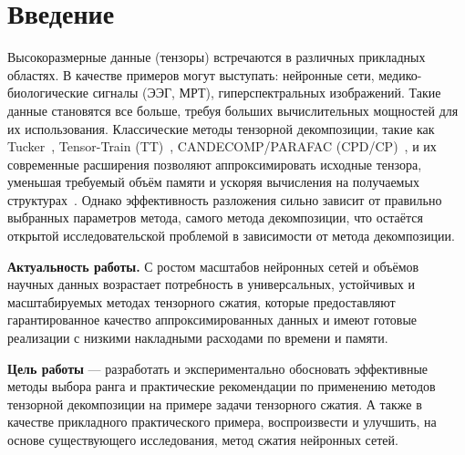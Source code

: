 \chapter{Введение}
\label{chap:intro}


Высокоразмерные данные (тензоры) встречаются в различных прикладных областях. В качестве примеров могут выступать: нейронные сети, медико-биологические сигналы (ЭЭГ, МРТ), гиперспектральных изображений. Такие данные становятся все больше, требуя больших вычислительных мощностей для их использования. Классические методы тензорной декомпозиции, такие как Tucker~\cite{tensorly_parafac_tucker}, Tensor-Train (TT)~\cite{tensorly_tensor_train}, CANDECOMP/PARAFAC (CPD/CP)~\cite{tensorly_parafac_tucker, tensorly_parafac_2, tensorly_parafac_3, tensor_decompositions_for_data_science, tensor_computation_for_data_analysis}, и их современные расширения позволяют аппроксимировать исходные тензора, уменьшая требуемый объём памяти и ускоряя вычисления на получаемых структурах~\cite{tensor_decompositions_for_data_science, tensor_computation_for_data_analysis}. Однако эффективность разложения сильно зависит от правильно выбранных параметров метода, самого метода декомпозиции, что остаётся открытой исследовательской проблемой в зависимости от метода декомпозиции.

\textbf{Актуальность работы.} С ростом масштабов нейронных сетей и объёмов научных данных возрастает потребность в универсальных, устойчивых и масштабируемых методах тензорного сжатия, которые предоставляют гарантированное качество аппроксимированных данных и имеют готовые реализации с низкими накладными расходами по времени и памяти.

\textbf{Цель работы} — разработать и экспериментально обосновать эффективные методы выбора ранга и практические рекомендации по применению методов тензорной декомпозиции на примере задачи тензорного сжатия. А также в качестве прикладного практического примера, воспроизвести и улучшить, на основе существующего исследования, метод сжатия нейронных сетей.

